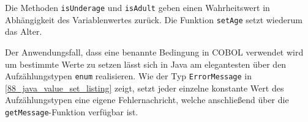 Die Methoden \texttt{isUnderage} und \texttt{isAdult} geben einen Wahrheitswert in Abhängigkeit des Variablenwertes zurück. Die Funktion \texttt{setAge} setzt wiederum das Alter.

Der Anwendungsfall, dass eine benannte Bedingung in COBOL verwendet wird um bestimmte Werte zu setzen lässt sich in Java am elegantesten über den Aufzählungstypen \texttt{enum} realisieren. Wie der Typ \texttt{ErrorMessage} in \autoref{88_java_value_set_listing} zeigt, setzt jeder einzelne konstante Wert des Aufzählungstypen eine eigene Fehlernachricht, welche anschließend über die \texttt{getMessage}-Funktion verfügbar ist.

